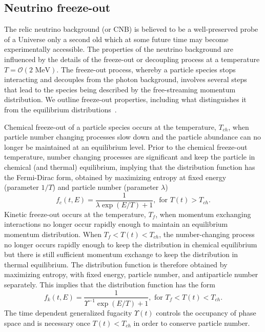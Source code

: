 \documentclass[universe,article,submit,moreauthors,pdftex,a4paper]{Definitions/mdpi}
\newcommand{\MeV}{\text{ MeV}}
\newcommand*{\xblue}{\color{blue}}
\begin{document}
\subsection{Neutrino freeze-out}\label{sec:Freezeout}
\noindent The relic neutrino background (or CNB) is believed to be a well-preserved probe of a Universe only a second old which at some future time may become experimentally accessible. The properties of the neutrino background are influenced by the details of the freeze-out or decoupling process at a temperature $T=\mathcal{O}(2\MeV)$. The freeze-out process, whereby a particle species stops interacting and decouples from the photon background, involves several steps that lead to the species being described by the free-streaming momentum distribution. We outline freeze-out properties, including what distinguishes it from the equilibrium distributions~\cite{Birrell:2012gg}.

Chemical freeze-out of a particle species occurs at the temperature, $T_{ch}$, when particle number changing processes slow down and the particle abundance can no longer be maintained at an equilibrium level. Prior to the chemical freeze-out temperature, number changing processes are significant and keep the particle in chemical (and thermal) equilibrium, implying that the distribution function has the Fermi-Dirac form, obtained by maximizing entropy at fixed energy {\xblue (parameter $1/T$) and  particle number (parameter $\lambda$)}
\begin{equation}\label{equilibrium}
f_{c}(t,E)=\frac{1}{\lambda\exp(E/T)+1}, \text{ for } T(t)> T_{ch}.
\end{equation}
Kinetic freeze-out occurs at the temperature, $T_f$, when momentum exchanging interactions no longer occur rapidly enough to maintain an equilibrium momentum distribution. When $T_f<T(t)<T_{ch}$, the number-changing process no longer occurs rapidly enough to keep the distribution in chemical equilibrium but there is still sufficient momentum exchange to keep the distribution in thermal equilibrium. The distribution function is therefore obtained by maximizing entropy, with fixed energy, particle number, and antiparticle number separately. This implies that the distribution function has the form
\begin{equation}\label{kinetic_equilib}
f_k(t,E)=\frac{1}{\Upsilon^{-1}\exp(E/T)+1}, \text{ for }T_f< T(t)< T_{ch}.
\end{equation}
{\xblue The time dependent generalized} fugacity $\Upsilon(t)$ controls the occupancy of phase space and is necessary once $T(t)<T_{ch}$ in order to conserve particle number.
 
\end{document}
